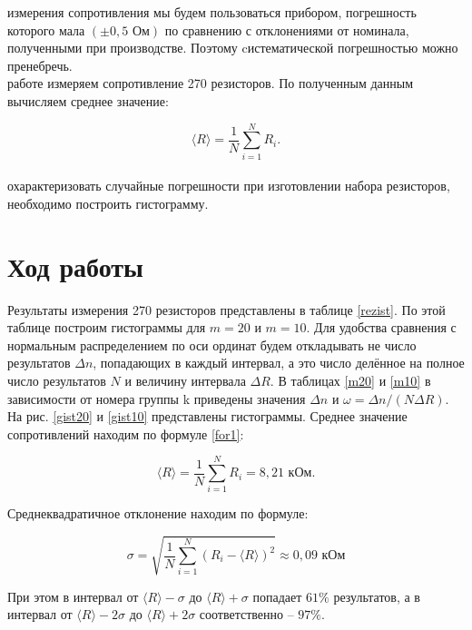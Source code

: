 \documentclass[a4paper,12pt]{article} %
\begin{document}
 измерения сопротивления мы будем пользоваться прибором, погрешность которого мала  $\left(  \pm 0,5 \text{ Ом} \right) $ по сравнению с отклонениями от номинала, полученными при производстве. Поэтому cистематической погрешностью можно пренебречь.\\

 работе измеряем сопротивление 270 резисторов. По полученным данным вычисляем среднее значение:

\begin{equation}\label{for1}
\langle R \rangle = \frac{1}{N} \sum_{i=1}^N R_i.
\end{equation}\\

 охарактеризовать случайные погрешности при изготовлении набора резисторов, необходимо построить гистограмму.

\section{Ход работы}

Результаты измерения 270 резисторов представлены в таблице \ref{rezist}. По этой таблице построим гистограммы для $ m = 20 $ и $ m = 10 $. Для удобства сравнения с нормальным распределением по оси ординат будем откладывать не число результатов $ \Delta n $, попадающих в каждый интервал, а это число делённое на полное число результатов $ N $ и величину интервала $ \Delta R $. В таблицах \ref{m20} и \ref{m10} в зависимости от номера группы k приведены значения $ \Delta n $ и $ \omega = \Delta n / \left( N\Delta R \right)  $. На рис. \ref{gist20} и \ref{gist10} представлены гистограммы. Среднее значение сопротивлений находим по формуле \eqref{for1}:

\begin{equation}
\langle R \rangle = \frac{1}{N} \sum_{i=1}^{N} R_i = 8,21 \text{ кОм}.
\end{equation}

Среднеквадратичное отклонение находим по формуле:

\begin{equation}
\sigma = \sqrt{\frac{1}{N} \sum_{i=1}^{N} \left( R_i - \langle R \rangle \right)^2 } \approx 0,09 \text{ кОм}
\end{equation}

При этом в интервал от $ \langle R \rangle - \sigma $ до $ \langle R \rangle + \sigma $ попадает $ 61\% $ результатов, а в интервал от $ \langle R \rangle - 2\sigma $ до $ \langle R \rangle + 2\sigma $ соответственно -- $ 97\% $.\\
\end{document}
